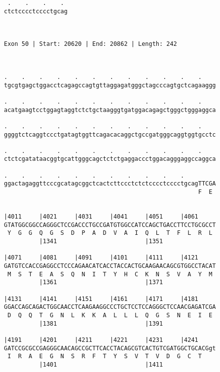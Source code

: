 \documentclass{article}
\begin{document}
\begin{Verbatim}
 .    .    .    . 
ctctcccctcccctgcag
                  
                  
 
Exon 50 | Start: 20620 | End: 20862 | Length: 242



.    .    .    .    .    .    .    .    .    .    .    .    
tgcgtgagctggacctcagagccagtgttaggagatgggctagcccagtgctcagaaggg
                                                            
.    .    .    .    .    .    .    .    .    .    .    .    
acatgaagtcctggagtaggtctctgctaagggtgatggacagagctgggctgggaggca
                                                            
.    .    .    .    .    .    .    .    .    .    .    .    
ggggtctcaggtccctgatagtggttcagacacaggctgccgatgggcaggtggtgcctc
                                                            
.    .    .    .    .    .    .    .    .    .    .    .    
ctctcgatataacggtgcattgggcagctctctgaggaccctggacagggaggccaggca
                                                            
.    .    .    .    .    .    .    .    .    .    .         
ggactagaggttcccgcatagcggctcactcttccctctctcccctcccctgcagTTCGA
                                                       F  E 
                                                            
  
|4011     |4021     |4031     |4041     |4051     |4061     
GTATGGCGGCCAGGGCTCCGACCCTGCCGATGTGGCCATCCAGCTGACCTTCCTGCGCCT
 Y  G  G  Q  G  S  D  P  A  D  V  A  I  Q  L  T  F  L  R  L 
          |1341                         |1351               
  
|4071     |4081     |4091     |4101     |4111     |4121     
GATGTCCACCGAGGCCTCCCAGAACATCACCTACCACTGCAAGAACAGCGTGGCCTACAT
 M  S  T  E  A  S  Q  N  I  T  Y  H  C  K  N  S  V  A  Y  M 
          |1361                         |1371               
  
|4131     |4141     |4151     |4161     |4171     |4181     
GGACCAGCAGACTGGCAACCTCAAGAAGGCCCTGCTCCTCCAGGGCTCCAACGAGATCGA
 D  Q  Q  T  G  N  L  K  K  A  L  L  L  Q  G  S  N  E  I  E 
          |1381                         |1391               
  
|4191     |4201     |4211     |4221     |4231     |4241     
GATCCGCGCCGAGGGCAACAGCCGCTTCACCTACAGCGTCACTGTCGATGGCTGCACGgt
 I  R  A  E  G  N  S  R  F  T  Y  S  V  T  V  D  G  C  T    
          |1401                         |1411               
  

\end{Verbatim}
\end{document}
